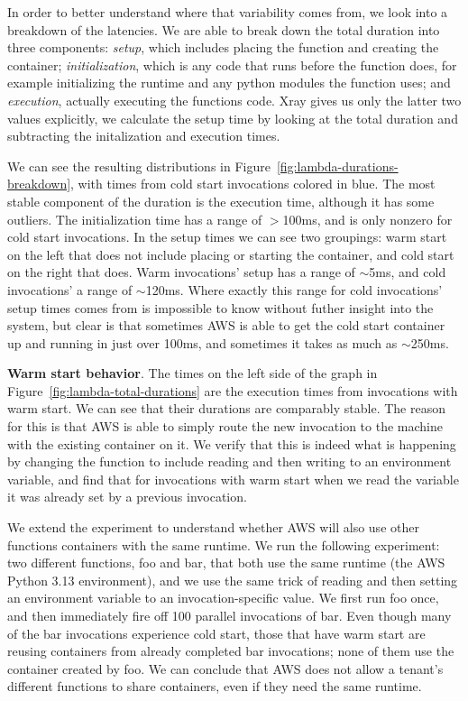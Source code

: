 In order to better understand where that variability comes from, we look into a
breakdown of the latencies. We are able to break down the total duration into
three components: \textit{setup}, which includes placing the function and
creating the container; \textit{initialization}, which is any code that runs
before the function does, for example initializing the runtime and any python
modules the function uses; and \textit{execution}, actually executing the
functions code. Xray gives us only the latter two values explicitly, we
calculate the setup time by looking at the total duration and subtracting the
initalization and execution times. 

We can see the resulting distributions in
Figure~\ref{fig:lambda-durations-breakdown}, with times from cold start
invocations colored in blue. The most stable component of the duration is the
execution time, although it has some outliers. The initialization time has a
range of $>$100ms, and is only nonzero for cold start invocations. In the setup
times we can see two groupings: warm start on the left that does not include
placing or starting the container, and cold start on the right that does. Warm
invocations' setup has a range of $\sim$5ms, and cold invocations' a range of
$\sim$120ms. Where exactly this range for cold invocations' setup times
comes from is impossible to know without futher insight into the system, but
clear is that sometimes AWS is able to get the cold start container up and
running in just over 100ms, and sometimes it takes as much as $\sim$250ms.


\textbf{Warm start behavior}. 
% 
The times on the left side of the graph in
Figure~\ref{fig:lambda-total-durations} are the execution times from invocations
with warm start. We can see that their durations are comparably stable. The
reason for this is that AWS is able to simply route the new invocation to the
machine with the existing container on it. We verify that this is indeed what is
happening by changing the function to include reading and then writing to an
environment variable, and find that for invocations with warm start when we read
the variable it was already set by a previous invocation.

We extend the experiment to understand whether AWS will also use other functions
containers with the same runtime. We run the following experiment: two different
functions, foo and bar, that both use the same runtime (the AWS Python 3.13
environment), and we use the same trick of reading and then setting an
environment variable to an invocation-specific value. We first run foo once, and
then immediately fire off 100 parallel invocations of bar. Even though many of
the bar invocations experience cold start, those that have warm start are
reusing containers from already completed bar invocations; none of them use the
container created by foo. We can conclude that AWS does not allow a tenant's
different functions to share containers, even if they need the same runtime.

